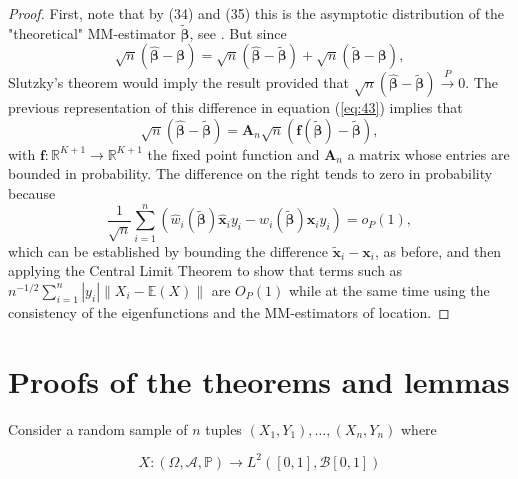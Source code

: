 \documentclass[11pt]{article}
\begin{document}
\begin{proof}
First, note that by (34) and (35) this is the asymptotic distribution of the "theoretical" MM-estimator $\widetilde{\boldsymbol{\beta}}$, see \citep{maronna2006robust}. But since
\begin{equation*}
\sqrt{n}(\widehat{\boldsymbol{\beta}} - \boldsymbol{\beta} ) = \sqrt{n}(\widehat{\boldsymbol{\beta}} - \widetilde{\boldsymbol{\beta}} ) + \sqrt{n}(\widetilde{\boldsymbol{\beta}} - \boldsymbol{\beta} ),
\end{equation*}
Slutzky's theorem would imply the result provided that $\sqrt{n}(\widehat{\boldsymbol{\beta}} - \widetilde{\boldsymbol{\beta}} ) \xrightarrow{P} 0 $. The previous representation of this difference in equation (\ref{eq:43}) implies that 
\begin{equation*}
\sqrt{n}(\widehat{\boldsymbol{\beta}} - \widetilde{\boldsymbol{\beta}} ) = \mathbf{A}_n \sqrt{n} ( \mathbf{f}(\widetilde{\boldsymbol{\beta}}) - \widetilde{\boldsymbol{\beta}}  ),
\end{equation*}
with $\mathbf{f}: \mathbb{R}^{K+1} \to \mathbb{R}^{K+1}$ the fixed point function and $\mathbf{A}_n$ a matrix whose entries are bounded in probability. The difference on the right tends to zero in probability because
\begin{equation*}
\frac{1}{\sqrt{n}}  \sum_{i=1}^n \left( \widehat{w}_i ( \boldsymbol{\widetilde{\beta}}) \mathbf{\widehat{x}}_i y_i - w_i ( \boldsymbol{\widetilde{\beta}}) \mathbf{x}_i y_i \right) = o_{P}(1),
\end{equation*}
which can be established by bounding the difference $\widetilde{\mathbf{x}}_i - \mathbf{x}_i $, as before, and then applying the Central Limit Theorem to show that terms such as $n^{-1/2} \sum_{i=1}^n |y_i| \left\|X_i - \mathbb{E}(X) \right\|$ are $O_{P}(1)$ while at the same time using the consistency of the eigenfunctions and the MM-estimators of location.

\end{proof}



\iffalse

\section{Proofs of the theorems and lemmas}


Consider a random sample of $n$ tuples $\left(X_1, Y_1 \right), \ldots, \left(X_n, Y_n\right)$ where

$$X: \left(\Omega, \mathcal{A}, \mathbb{P} \right) \to L^2 \left([0,1], \mathcal{B}[0,1]  \right)$$ 
\end{document}
